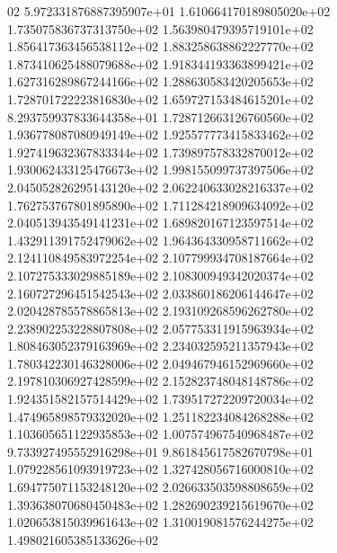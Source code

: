 02	5.972331876887395907e+01	1.610664170189805020e+02	1.735075836737313750e+02	1.563980479395719101e+02	1.856417363456538112e+02	1.883258638862227770e+02	1.873410625488079688e+02	1.918344193363899421e+02	1.627316289867244166e+02	1.288630583420205653e+02	1.728701722223816830e+02	1.659727153484615201e+02	8.293759937833644358e+01	1.728712663126760560e+02	1.936778087080949149e+02	1.925577773415833462e+02	1.927419632367833344e+02	1.739897578332870012e+02	1.930062433125476673e+02	1.998155099737397506e+02	2.045052826295143120e+02	2.062240633028216337e+02	1.762753767801895890e+02	1.711284218909634092e+02	2.040513943549141231e+02	1.689820167123597514e+02	1.432911391752479062e+02	1.964364330958711662e+02	2.124110849583972254e+02	2.107799934708187664e+02	2.107275333029885189e+02	2.108300949342020374e+02	2.160727296451542543e+02	2.033860186206144647e+02	2.020428785578865813e+02	2.193109268596262780e+02	2.238902253228807808e+02	2.057753311915963934e+02	1.808463052379163969e+02	2.234032595211357943e+02	1.780342230146328006e+02	2.049467946152969660e+02	2.197810306927428599e+02	2.152823748048148786e+02	1.924351582157514429e+02	1.739517272209720034e+02	1.474965898579332020e+02	1.251182234084268288e+02	1.103605651122935853e+02	1.007574967540968487e+02	9.733927495552916298e+01	9.861845617582670798e+01	1.079228561093919723e+02	1.327428056716000810e+02	1.694775071153248120e+02	2.026633503598808659e+02	1.393638070680450483e+02	1.282690239215619670e+02	1.020653815039961643e+02	1.310019081576244275e+02	1.498021605385133626e+02
